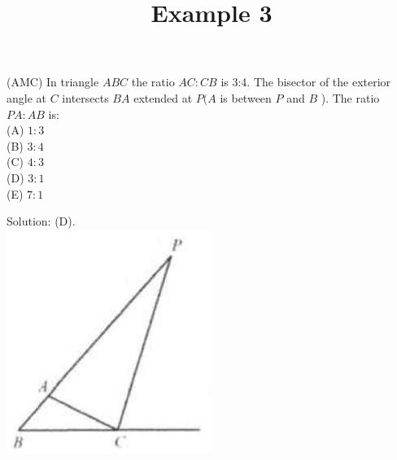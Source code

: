 \documentclass{article}
\title{Example 3}
\date{}
\begin{document}
\maketitle

(AMC) In triangle \(A B C\) the ratio \(A C: C B\) is 3:4. The bisector of the exterior angle at \(C\) intersects \(B A\) extended at \(P(A\) is between \(P\) and \(B\) ). The ratio \(P A: A B\) is:\\
(A) \(1: 3\)\\
(B) \(3: 4\)\\
(C) \(4: 3\)\\
(D) \(3: 1\)\\
(E) \(7: 1\)

Solution: (D).\\
\centering
\includegraphics[width=\textwidth]{images/problem_image_1.jpg}
\end{document}
